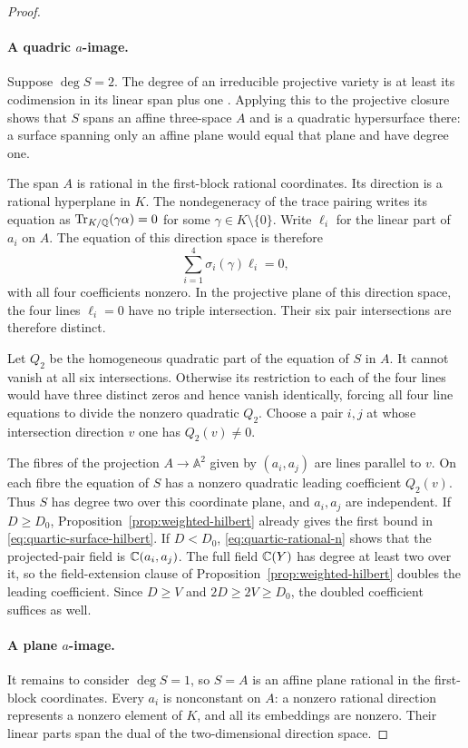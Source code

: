 \begin{proof}
\paragraph{A quadric $a$-image.}
Suppose $\deg S=2$.  The degree of an irreducible projective variety is
at least its codimension in its linear span plus one
\cite[Introduction, equation~$(*)$]{EisenbudGreenHulekPopescu2006}.
Applying this to
the projective closure shows that $S$ spans an affine three-space $A$
and is a quadratic hypersurface there: a surface spanning only an affine
plane would equal that plane and have degree one.

The span $A$ is rational in the first-block rational coordinates.  Its
direction is a rational hyperplane in $K$.  The nondegeneracy of the trace
pairing writes its equation as $\operatorname{Tr}_{K/\mathbb Q}(\gamma\alpha)=0$
for some $\gamma\in K\setminus\{0\}$.  Write $\ell_i$ for the linear
part of $a_i$ on $A$.  The equation of this direction space is therefore
\[
 \sum_{i=1}^4\sigma_i(\gamma)\ell_i=0,
\]
with all four coefficients nonzero.  In the projective plane of this
direction space, the four lines $\ell_i=0$ have no triple intersection.
Their six pair intersections are therefore distinct.

Let $Q_2$ be the homogeneous quadratic part of the equation of $S$ in
$A$.  It cannot vanish at all six intersections.  Otherwise its
restriction to each of the four lines would have three distinct zeros
and hence vanish identically, forcing all four line equations to divide
the nonzero quadratic $Q_2$.  Choose a pair $i,j$ at whose intersection
direction $v$ one has $Q_2(v)\ne0$.

The fibres of the projection $A\to\mathbb A^2$ given by $(a_i,a_j)$ are
lines parallel to $v$.  On each fibre the equation of $S$ has a nonzero
quadratic leading coefficient $Q_2(v)$.  Thus $S$ has degree two over
this coordinate plane, and $a_i,a_j$ are independent.  If $D\ge D_0$,
Proposition~\ref{prop:weighted-hilbert} already gives the first bound
in \eqref{eq:quartic-surface-hilbert}.  If $D<D_0$,
\eqref{eq:quartic-rational-n} shows that the projected-pair field is
$\mathbb C(a_i,a_j)$.  The full field $\mathbb C(Y)$ has degree at least two over it,
so the field-extension clause of Proposition~\ref{prop:weighted-hilbert}
doubles the leading coefficient.  Since $D\ge V$ and
$2D\ge2V\ge D_0$, the doubled coefficient suffices as well.

\paragraph{A plane $a$-image.}
It remains to consider $\deg S=1$, so $S=A$ is an affine plane rational
in the first-block coordinates.  Every $a_i$ is nonconstant on $A$:
a nonzero rational direction represents a nonzero element of $K$, and
all its embeddings are nonzero.  Their linear parts span the dual of
the two-dimensional direction space.


\end{proof}
